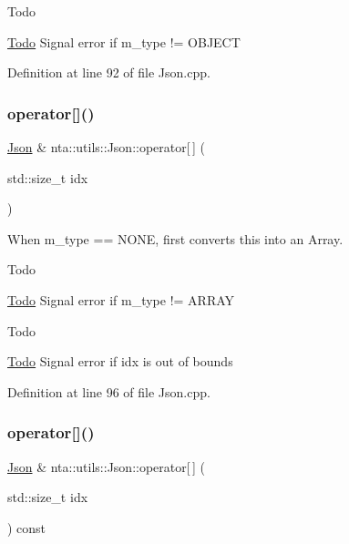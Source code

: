 \begin{DoxyRefDesc}{Todo}
\item[\hyperlink{todo__todo000020}{Todo}]Signal error if m\+\_\+type != O\+B\+J\+E\+CT \end{DoxyRefDesc}


Definition at line 92 of file Json.\+cpp.

\mbox{\label{classnta_1_1utils_1_1Json_a236b5885612b74c21fbad169b21eaf55}} 
\subsubsection{\texorpdfstring{operator[]()}{operator[]()}\hspace{0.1cm}{\footnotesize\ttfamily [3/4]}}
{\footnotesize\ttfamily \hyperlink{classnta_1_1utils_1_1Json}{Json} \& nta\+::utils\+::\+Json\+::operator\mbox{[}$\,$\mbox{]} (\begin{DoxyParamCaption}\item[{std\+::size\+\_\+t}]{idx }\end{DoxyParamCaption})}



When m\+\_\+type == N\+O\+NE, first converts this into an Array. 

\begin{DoxyRefDesc}{Todo}
\item[\hyperlink{todo__todo000021}{Todo}]Signal error if m\+\_\+type != A\+R\+R\+AY \end{DoxyRefDesc}
\begin{DoxyRefDesc}{Todo}
\item[\hyperlink{todo__todo000022}{Todo}]Signal error if idx is out of bounds \end{DoxyRefDesc}


Definition at line 96 of file Json.\+cpp.

\mbox{\label{classnta_1_1utils_1_1Json_a893f191111e604995488d147aaa711f8}} 
\subsubsection{\texorpdfstring{operator[]()}{operator[]()}\hspace{0.1cm}{\footnotesize\ttfamily [4/4]}}
{\footnotesize\ttfamily \hyperlink{classnta_1_1utils_1_1Json}{Json} \& nta\+::utils\+::\+Json\+::operator\mbox{[}$\,$\mbox{]} (\begin{DoxyParamCaption}\item[{std\+::size\+\_\+t}]{idx }\end{DoxyParamCaption}) const}

